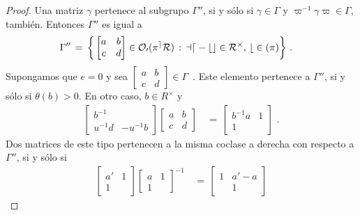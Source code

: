 \begin{proof}
	Una matriz $\gamma$ pertenece al subgrupo $\Gamma''$, si y s\'{o}lo si
	$\gamma\in\Gamma$ y $\varpi^{-1}\gamma\varpi\in\Gamma$, tambi\'{e}n.
	Entonces $\Gamma''$ es igual a
	\begin{align*}
		\Gamma'' & \,=\,\bigg\{
			\begin{bmatrix} a & b \\ c & d \end{bmatrix}
			\in\cal{O}_{0}(\pi^{e}R)\,:\,ad-bc\in R^{\times},\,
				b\in (\pi)\bigg\}
		\text{ .}
	\end{align*}
	Supongamos que $e=0$ y sea
	\begin{math}
		\begin{bmatrix} a & b \\ c & d \end{bmatrix}
			\in\Gamma
	\end{math}~.
	Este elemento pertenece a $\Gamma''$, si y s\'{o}lo si $\theta(b)>0$.
	En otro caso, $b\in R^{\times}$ y
	\begin{align*}
		\begin{bmatrix} b^{-1} & \\ u^{-1}d & -u^{-1}b \end{bmatrix}
			\begin{bmatrix} a & b \\ c & d \end{bmatrix}
		& \,=\, \begin{bmatrix} b^{-1}a & 1 \\ 1 & \end{bmatrix}
		\text{ .}
	\end{align*}
	Dos matrices de este tipo pertenecen a la misma coclase a derecha con
	respecto a $\Gamma''$, si y s\'{o}lo si
	\begin{align*}
		\begin{bmatrix} a' & 1 \\ 1 & \end{bmatrix}
			\begin{bmatrix} a & 1 \\ 1 & \end{bmatrix}^{-1}
		& \,=\,\begin{bmatrix} 1 & a'-a \\ & 1 \end{bmatrix}
	\end{align*}

\end{proof}
